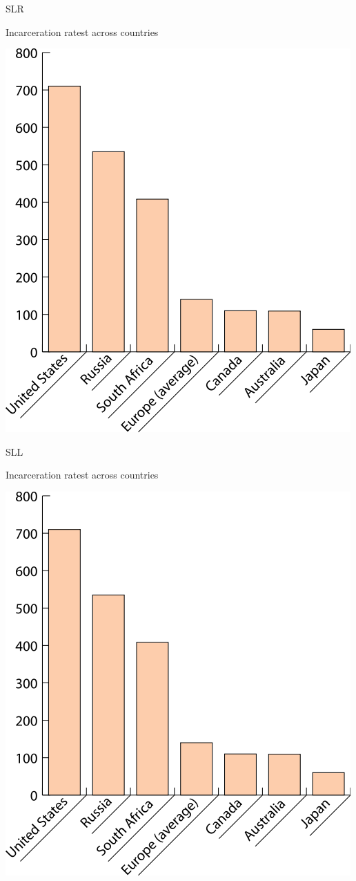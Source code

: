\begin{chart}{S}{LR}
\caption{Incarceration ratest across countries}
\label{chart:incarceration}
\includegraphics[width=\chartwidth,height=\chartheight]{incarceration}  
\end{chart}

\begin{chart}{S}{LL}
\caption{Incarceration ratest across countries}
\label{chart:incarceration}
\includegraphics[width=\chartwidth,height=\chartheight]{incarceration}  
\end{chart}

